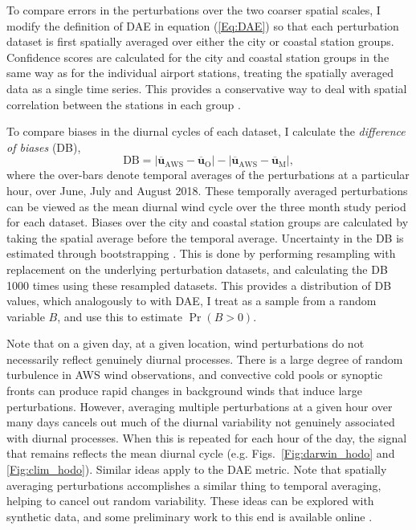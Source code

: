\documentclass{ametsoc}
\DeclareMathOperator{\pr}{Pr}
\begin{document}
To compare errors in the perturbations over the two coarser spatial scales, I modify the definition of DAE in equation (\ref{Eq:DAE}) so that each perturbation dataset is first spatially averaged over either the city or coastal station groups. Confidence scores are calculated for the city and coastal station groups in the same way as for the individual airport stations, treating the spatially averaged data as a single time series. This provides a conservative way to deal with spatial correlation between the stations in each group \citep{griffiths17}. 

To compare biases in the diurnal cycles of each dataset, I calculate the \textit{difference of biases} (DB),
\begin{equation}
\text{DB} = \left\lvert \overline{\mathbf{u}}_{\text{AWS}}-\overline{\mathbf{u}}_{\text{O}} \right\rvert - \left\lvert \overline{\mathbf{u}}_{\text{AWS}}-\overline{\mathbf{u}}_{\text{M}} \right\rvert,
\end{equation}
where the over-bars denote temporal averages of the perturbations at a particular hour, over June, July and August 2018. These temporally averaged perturbations can be viewed as the mean diurnal wind cycle over the three month study period for each dataset. Biases over the city and coastal station groups are calculated by taking the spatial average before the temporal average. Uncertainty in the DB is estimated through bootstrapping \citep{efron79}. This is done by performing resampling with replacement on the underlying perturbation datasets, and calculating the DB 1000 times using these resampled datasets. This provides a distribution of DB values, which analogously to with DAE, I treat as a sample from a random variable $B$, and use this to estimate $\pr\left(B > 0\right)$.

Note that on a given day, at a given location, wind perturbations do not necessarily reflect genuinely diurnal processes. There is a large degree of random turbulence in AWS wind observations, and convective cold pools or synoptic fronts can produce rapid changes in background winds that induce large perturbations. However, averaging multiple perturbations at a given hour over many days cancels out much of the diurnal variability not genuinely associated with diurnal processes. When this is repeated for each hour of the day, the signal that remains reflects the mean diurnal cycle (e.g. Figs.~\ref{Fig:darwin_hodo} and \ref{Fig:clim_hodo}). Similar ideas apply to the DAE metric. Note that spatially averaging perturbations accomplishes a similar thing to temporal averaging, helping to cancel out random variability. These ideas can be explored with synthetic data, and some preliminary work to this end is available online \citep{short20}.
\end{document}
